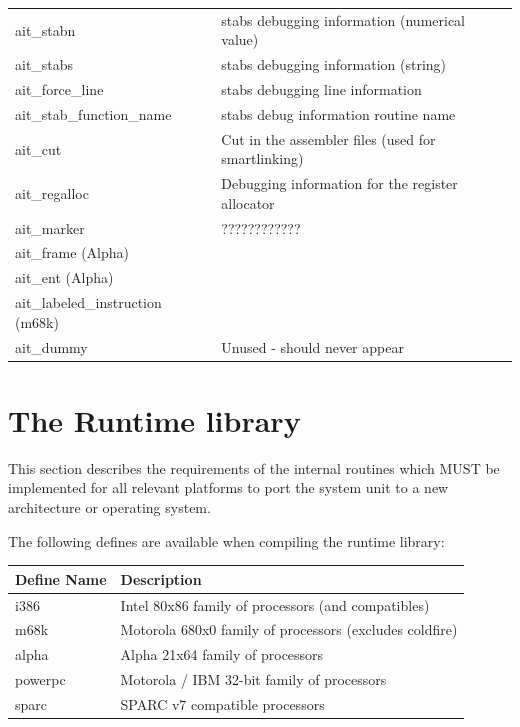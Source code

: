 \documentclass [12pt]{article}
\begin{document}
\begin{longtable}{|l|p{10cm}|}
ait{\_}stabn &
    stabs debugging information (numerical value) \\
ait{\_}stabs &
    stabs debugging information (string) \\
ait{\_}force{\_}line& 
    stabs debugging line information \\
ait{\_}stab{\_}function{\_}name& 
    stabs debug information routine name \\
ait{\_}cut& 
    Cut in the assembler files (used for smartlinking) \\
ait{\_}regalloc& 
    Debugging information for the register allocator \\
ait{\_}marker  & ???????????? \\
ait{\_}frame (Alpha)&  \\
ait{\_}ent (Alpha)&  \\
ait{\_}labeled{\_}instruction (m68k)&  \\
ait{\_}dummy & Unused - should never appear
\end{longtable}

\section{The Runtime library}
\label{sec:mylabel9}

This section describes the requirements of the internal routines which MUST 
be implemented for all relevant platforms to port the system unit to a new 
architecture or operating system. 

The following defines are available when compiling the runtime library:

\begin{longtable}{|l|p{10cm}|}
\hline
Define Name & Description \\
\hline
\endhead
\hline
\endfoot
i386        & Intel 80x86 family of processors (and compatibles) \\
m68k        & Motorola 680x0 family of processors (excludes coldfire) \\
alpha       & Alpha 21x64 family of processors \\
powerpc     & Motorola / IBM 32-bit family of processors \\
sparc       & SPARC v7 compatible processors
\end{longtable}
\end{document}
